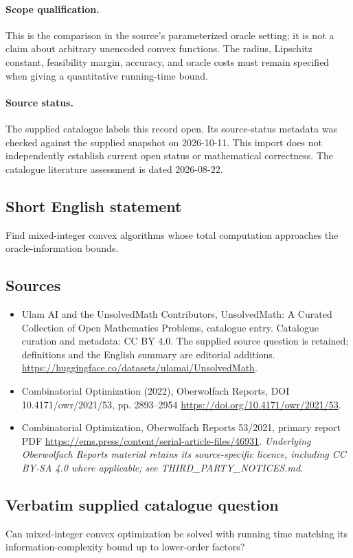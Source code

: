 \documentclass[11pt]{article}
\begin{document}
\paragraph{Scope qualification.}
This is the comparison in the source's parameterized oracle setting; it is not a claim about arbitrary unencoded convex functions. The radius, Lipschitz constant, feasibility margin, accuracy, and oracle costs must remain specified when giving a quantitative running-time bound.
\paragraph{Source status.}
The supplied catalogue labels this record open. Its source-status metadata was checked against the supplied snapshot on 2026-10-11. This import does not independently establish current open status or mathematical correctness. The catalogue literature assessment is dated 2026-08-22.
\subsection{Short English statement}
Find mixed-integer convex algorithms whose total computation approaches the oracle-information bounds.
\subsection{Sources}
\begin{itemize}
\item[S1] Ulam AI and the UnsolvedMath Contributors, UnsolvedMath: A Curated Collection of Open Mathematics Problems, catalogue entry. Catalogue curation and metadata: CC BY 4.0. The supplied source question is retained; definitions and the English summary are editorial additions.
\url{https://huggingface.co/datasets/ulamai/UnsolvedMath}.
\item[S2] Combinatorial Optimization (2022), Oberwolfach Reports, DOI 10.4171/owr/2021/53, pp. 2893--2954
\url{https://doi.org/10.4171/owr/2021/53}.
\item[S3] Combinatorial Optimization, Oberwolfach Reports 53/2021, primary report PDF
\url{https://ems.press/content/serial-article-files/46931}.
\textit{Underlying Oberwolfach Reports material retains its source-specific licence, including CC BY-SA 4.0 where applicable; see THIRD\_PARTY\_NOTICES.md.}
\end{itemize}
\subsection{Verbatim supplied catalogue question}
Can mixed-integer convex optimization be solved with running time matching its information-complexity bound up to lower-order factors?
\end{document}
